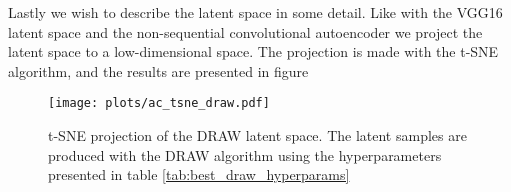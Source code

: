 Lastly we wish to describe the latent space in some detail. Like with the VGG16 latent space and the non-sequential convolutional autoencoder we project the latent space to a low-dimensional space. The projection is made with the t-SNE algorithm, and the results are presented in figure 


\begin{figure}
\texttt{[image: plots/ac\_tsne\_draw.pdf]}
\caption[t-SNE projection of the DRAW latent space]{t-SNE projection of the DRAW latent space.  The latent samples are produced with the DRAW algorithm using the hyperparameters presented in table \ref{tab:best_draw_hyperparams}}
\end{figure}
